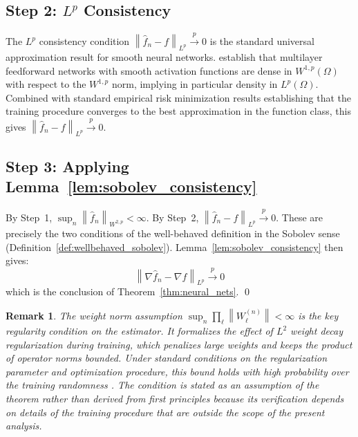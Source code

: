 \documentclass[12pt]{article}
\newtheorem{remark}{Remark}
\newcommand{\norm}[1]{\left\| #1 \right\|}
\newcommand{\fn}{\hat{f}_n}
\newcommand{\xrightarrowp}{\xrightarrow{p}}
\begin{document}
	\subsection{Step 2: $L^p$ Consistency}
	
	The $L^p$ consistency condition $\norm{\fn - f}_{L^p} \xrightarrowp 0$ is
	the standard universal approximation result for smooth neural networks.
	\citet{hornik1990universal} establish that multilayer feedforward networks
	with smooth activation functions are dense in $W^{1,p}(\Omega)$ with respect
	to the $W^{1,p}$ norm, implying in particular density in $L^p(\Omega)$.
	Combined with standard empirical risk minimization results establishing that
	the training procedure converges to the best approximation in the function
	class, this gives $\norm{\fn - f}_{L^p} \xrightarrowp 0$.
	
	\subsection{Step 3: Applying Lemma~\ref{lem:sobolev_consistency}}
	
	By Step~1, $\sup_n \norm{\fn}_{W^{2,p}} < \infty$. By Step~2,
	$\norm{\fn - f}_{L^p} \xrightarrowp 0$. These are precisely the two
	conditions of the well-behaved definition in the Sobolev sense
	(Definition~\ref{def:wellbehaved_sobolev}). Lemma~\ref{lem:sobolev_consistency}
	then gives:
	\begin{equation}
		\norm{\nabla \fn - \nabla f}_{L^p} \xrightarrowp 0
	\end{equation}
	which is the conclusion of Theorem~\ref{thm:neural_nets}. 
	\qed
	
	\begin{remark}
		The weight norm assumption $\sup_n \prod_\ell \norm{W_\ell^{(n)}} < \infty$
		is the key regularity condition on the estimator. It formalizes the effect
		of $L^2$ weight decay regularization during training, which penalizes large
		weights and keeps the product of operator norms bounded. Under standard
		conditions on the regularization parameter and optimization procedure,
		this bound holds with high probability over the training randomness
		\citep{bartlett2017spectrally}. The condition is stated as an assumption
		of the theorem rather than derived from first principles because its
		verification depends on details of the training procedure that are outside
		the scope of the present analysis.
	\end{remark}
	
\end{document}
